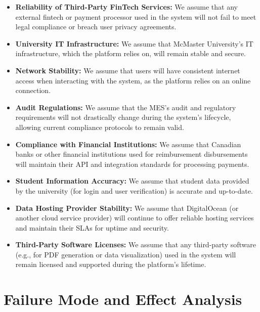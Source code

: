 \documentclass{article}
\begin{document}
\begin{itemize}
    \item \textbf{Reliability of Third-Party FinTech Services:} We assume that any external fintech or payment processor used in the system will not fail to meet legal compliance or breach user privacy agreements.
    
    \item \textbf{University IT Infrastructure:} We assume that McMaster University’s IT infrastructure, which the platform relies on, will remain stable and secure.
    
    \item \textbf{Network Stability:} We assume that users will have consistent internet access when interacting with the system, as the platform relies on an online connection.
    
    \item \textbf{Audit Regulations:} We assume that the MES's audit and regulatory requirements will not drastically change during the system's lifecycle, allowing current compliance protocols to remain valid.
    
    \item \textbf{Compliance with Financial Institutions:} We assume that Canadian banks or other financial institutions used for reimbursement disbursements will maintain their API and integration standards for processing payments.
    
    \item \textbf{Student Information Accuracy:} We assume that student data provided by the university (for login and user verification) is accurate and up-to-date.
    
    \item \textbf{Data Hosting Provider Stability:} We assume that DigitalOcean (or another cloud service provider) will continue to offer reliable hosting services and maintain their SLAs for uptime and security.
    
    \item \textbf{Third-Party Software Licenses:} We assume that any third-party software (e.g., for PDF generation or data visualization) used in the system will remain licensed and supported during the platform's lifetime.
\end{itemize}



\section{Failure Mode and Effect Analysis}
\end{document}
